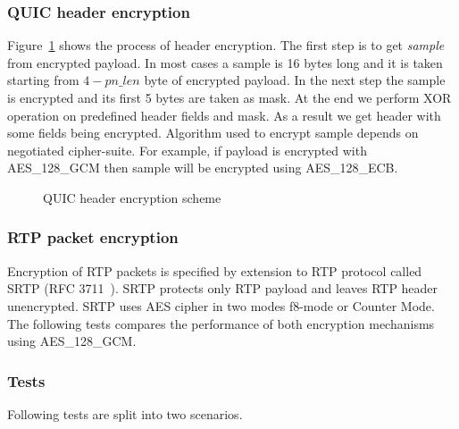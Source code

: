 \subsubsection{QUIC header encryption}
Figure~\ref{fig:header_enc} shows the process of header encryption.
The first step is to get \textit{sample} from encrypted payload.
In most cases a sample is 16 bytes long and it is taken starting from $4 - pn\_len$ byte of encrypted payload.
In the next step the sample is encrypted and its first 5 bytes are taken as mask.
At the end we perform XOR operation on predefined header fields and mask.
As a result we get header with some fields being encrypted.
Algorithm used to encrypt sample depends on negotiated cipher-suite.
For example, if payload is encrypted with AES\_128\_GCM then sample will be encrypted using AES\_128\_ECB\@.

\begin{figure}[h]
    \centering
    \caption{QUIC header encryption scheme}
    \label{fig:header_enc}
\end{figure}

\subsubsection{RTP packet encryption}
Encryption of RTP packets is specified by extension to RTP protocol called SRTP (RFC 3711~\cite{rfc3711}).
SRTP protects only RTP payload and leaves RTP header unencrypted.
SRTP uses AES cipher in two modes f8-mode or Counter Mode.
The following tests compares the performance of both encryption mechanisms using AES\_128\_GCM\@.

\subsubsection{Tests}
\label{subsubsec:tests}
Following tests are split into two scenarios.

